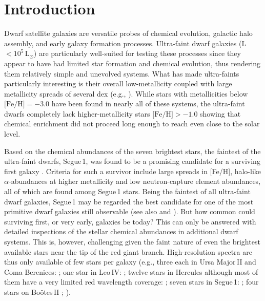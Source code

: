 \documentclass[]{emulateapj}
\begin{document}


\section{Introduction}

Dwarf satellite galaxies are versatile probes of chemical evolution,
galactic halo assembly, and early galaxy formation processes.
Ultra-faint dwarf galaxies (L$<10^{5}$\,L$_{\odot}$) are particularly
well-suited for testing these processes since they appear to have had
limited star formation and chemical evolution, thus rendering them relatively
simple and unevolved systems. What has made ultra-faints particularly
interesting is their overall low-metallicity coupled with large
metallicity spreads of several dex (e.g., \citep{kirby08}). While
stars with metallicities below $\mbox{[Fe/H]}=-3.0$ have been found in
nearly all of these systems, the ultra-faint dwarfs completely lack
higher-metallicity stars $\mbox{[Fe/H]}>-1.0$ showing that chemical
enrichment did not proceed long enough to reach even close to the
solar level.

Based on the chemical abundances of the seven brightest stars, the
faintest of the ultra-faint dwarfs, Segue\,1, was found to be a
promising candidate for a surviving first galaxy
\citep{frebel14}. Criteria for such a survivor include large spreads
in [Fe/H], halo-like $\alpha$-abundances at higher metallicity and low
neutron-capture element abundances, all of which are found among
Segue\,1 stars. Being the faintest of all ultra-faint dwarf galaxies,
Segue\,1 may be regarded the best candidate for one of the most
primitive dwarf galaxies still observable (see also \citealt{ji15} and
\citealt{webster15}). But how common could surviving first, or very
early, galaxies be today? This can only be answered with detailed
inspections of the stellar chemical abundances in additional dwarf
systems. This is, however, challenging given the faint nature of even
the brightest available stars near the tip of the red giant
branch. High-resolution spectra are thus only available of few stars
per galaxy (e.g., three each in Ursa Major\,II and Coma Berenices:
\citealt{frebel10}; one star in Leo\,IV: \citealt{leo4}; twelve stars
in Hercules although most of them have a very limited red wavelength
coverage: \citealt{koch_her, aden11}; seven stars in Segue\,1:
\citealt{norris10_seg,frebel14}; four stars on Bo\"otes\,II
\citealt{koch14}; \citealt{ji16a}).
\end{document}

